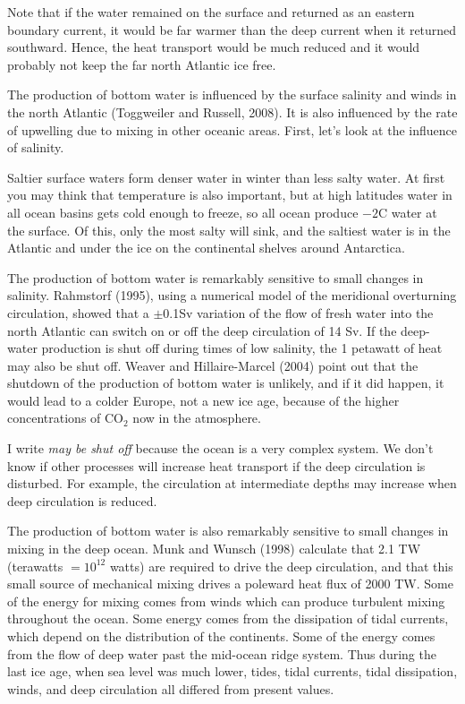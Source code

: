 Note that if the water remained on the surface and returned as an eastern
boundary current, it would be far warmer than the deep current when it returned
southward. Hence, the heat transport would be much reduced and it would probably not keep the far north Atlantic ice free.

The production of bottom water is influenced by the surface salinity and winds in the north Atlantic (Toggweiler and Russell, 2008). It is also influenced by the rate of upwelling due to mixing in other oceanic areas. First, let's look at the influence of salinity.

Saltier surface waters form denser water in winter than less salty water. At first you may think that temperature is also important, but at high latitudes water in all ocean basins gets cold enough to freeze, so all ocean produce $-2$\degrees C water at the surface. Of this, only the most salty will sink, and the saltiest water is in the Atlantic and under the ice on the continental shelves around Antarctica.

The production of bottom water is remarkably sensitive to small changes in salinity. Rahmstorf (1995), using a numerical model of the meridional over\-turning circulation, showed that a $\pm$0.1Sv variation of the flow of fresh water into the north Atlantic can switch on or off the deep circulation of 14 Sv. If the deep-water production is shut off during times of low salinity, the 1 petawatt of heat may also be shut off. Weaver and Hillaire-Marcel (2004) point out that the shutdown of the production of bottom water is unlikely, and if it did happen, it would lead to a colder Europe, not a new ice age, because of the higher concentrations of CO$_2$ now in the atmosphere.

I write \textit{may be shut off} because the ocean is a very complex system. We
don't know if other processes will increase heat transport if the deep
circulation is disturbed. For example, the circulation at intermediate depths
may increase when deep circulation is reduced.

The production of bottom water is also remarkably sensitive to small changes in mixing in the deep ocean. Munk and Wunsch (1998) calculate that 2.1 TW (terawatts $= 10^{12}$ watts) are required to drive the deep circulation, and that this small source of mechanical mixing drives a poleward heat flux of 2000 TW. Some  of the energy for mixing comes from winds which can produce turbulent mixing throughout the ocean. Some energy comes from the dissipation of tidal currents, which depend on the distribution of the continents. Some of the energy comes from the flow of deep water past the mid-ocean ridge system. Thus during the last ice age, when sea level was much lower, tides, tidal currents, tidal dissipation, winds, and deep circulation all differed from present values.

